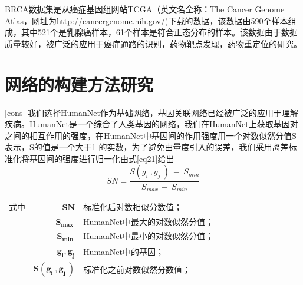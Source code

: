 BRCA数据集是从癌症基因组网站TCGA（英文名全称：The Cancer Genome Atlas，网址为http://cancergenome.nih.gov/)下载的数据，该数据由590个样本组成，其中521个是乳腺癌样本，61个样本是符合正态分布的样本。该数据由于数据质量较好，被广泛的应用于癌症通路的识别，药物靶点发现，药物重定位的研究。

\section{网络的构建方法研究}[cons]
\label{cons}
我们选择HumanNet作为基础网络，基因关联网络已经被广泛的应用于理解疾病。HumanNet是一个综合了人类基因的网络，我们在HumanNet上获取基因对之间的相互作用的强度，在HumanNet中基因间的作用强度用一个对数似然分值S表示，S的值是一个大于1 的实数，为了避免由量度引入的误差，我们采用离差标准化将基因间的强度进行归一化由式\ref{eq21}给出
\begin{equation}\label{eq21}
SN=\frac{S( g_{i} \ ,g_{j} \ ) \ -\ S_{min}}{S_{max\ } -\ S_{min}}
\end{equation}

\begin{tabularx}{\textwidth}{@{}l@{\quad}r@{———}X@{}}
式中& $\boldsymbol{SN}$ & 标准化后对数相似分数值；\\
	& $\boldsymbol{S_{max\ }}$ &HumanNet中最大的对数似然分值；\\
	& $\boldsymbol{S_{min\ }}$ &HumanNet中最小的对数似然分值；\\
	 & $\boldsymbol{ g_{i}, g_{j}}$ &HumanNet中的基因；\\
	& $\boldsymbol{S( g_{i} \ ,g_{j} \ )}$ & 标准化之前对数似然分数值；\\
\end{tabularx}\vspace{3.15bp}

